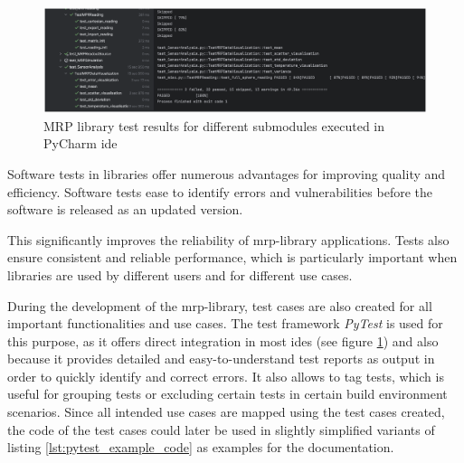 \begin{figure}
\centering
\includegraphics{./generated_images/border_MRP_library_test_results_for_different_submodules_executed_in_PyCharm_(+ide).png}
\caption{MRP library test results for different submodules executed in
PyCharm \gls{ide}
\label{MRP_library_test_results_for_different_submodules_executed_in_PyCharm_(+ide).png}}
\end{figure}

Software tests in libraries offer numerous advantages for improving
quality and efficiency. Software tests ease to identify errors and
vulnerabilities before the software is released as an updated version.

This significantly improves the reliability of \gls{mrp}-library
applications. Tests also ensure consistent and reliable performance,
which is particularly important when libraries are used by different
users and for different use cases.

During the development of the \gls{mrp}-library, test cases are also
created for all important functionalities and use cases. The test
framework \emph{PyTest}  is used for this purpose, as it
offers direct integration in most \gls{ide}s (see figure
\ref{MRP_library_test_results_for_different_submodules_executed_in_PyCharm_(+ide).png})
and also because it provides detailed and easy-to-understand test
reports as output in order to quickly identify and correct errors. It
also allows to tag tests, which is useful for grouping tests or
excluding certain tests in certain build environment scenarios. Since
all intended use cases are mapped using the test cases created, the code
of the test cases could later be used in slightly simplified variants of
listing \ref{lst:pytest_example_code} as examples for the documentation.

